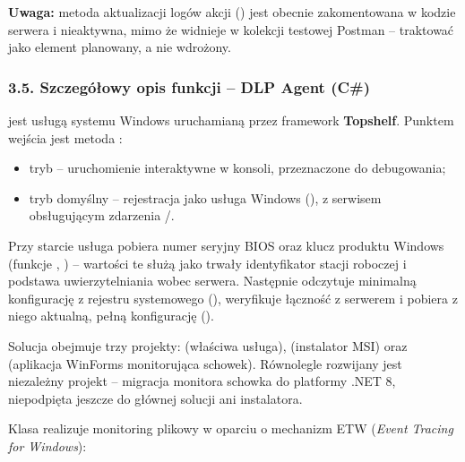 \noindent\textbf{Uwaga:} metoda aktualizacji logów akcji () jest
obecnie zakomentowana w kodzie serwera i nieaktywna, mimo że widnieje w kolekcji testowej Postman
-- traktować jako element planowany, a nie wdrożony.

\subsubsection*{3.5. Szczegółowy opis funkcji -- DLP Agent (C\#)}


 jest usługą systemu Windows uruchamianą przez framework \textbf{Topshelf}. Punktem
wejścia jest metoda :

\begin{itemize}
  \item tryb  -- uruchomienie interaktywne w konsoli, przeznaczone do debugowania;
  \item tryb domyślny -- rejestracja jako usługa Windows (), z serwisem
         obsługującym zdarzenia /.
\end{itemize}

Przy starcie usługa pobiera numer seryjny BIOS oraz klucz produktu Windows (funkcje
, ) -- wartości te służą jako
trwały identyfikator stacji roboczej i podstawa uwierzytelniania wobec serwera. Następnie odczytuje
minimalną konfigurację z rejestru systemowego (),
weryfikuje łączność z serwerem i pobiera z niego aktualną, pełną konfigurację
().

Solucja  obejmuje trzy projekty:  (właściwa usługa),
 (instalator MSI) oraz  (aplikacja WinForms
monitorująca schowek). Równolegle rozwijany jest niezależny projekt
 -- migracja monitora schowka do platformy .NET 8, niepodpięta
jeszcze do głównej solucji ani instalatora.


Klasa  realizuje monitoring plikowy w oparciu o mechanizm ETW
(\emph{Event Tracing for Windows}):

